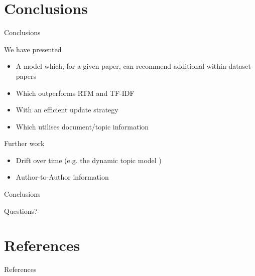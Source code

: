 \documentclass[xcolor=dvipsnames]{beamer}
\begin{document}

\section{Conclusions}
\begin{frame}{Conclusions}

We have presented
\begin{itemize}
    \item A model which, for a given paper, can recommend additional within-dataset papers 
    \item Which outperforms RTM and TF-IDF
    \item With an efficient update strategy
    \item Which utilises document/topic information 
\end{itemize}
Further work
\begin{itemize}
    \item Drift over time (e.g. the dynamic topic model \cite{Blei2006a})
    \item Author-to-Author information
\end{itemize}

\end{frame}

\begin{frame}{Conclusions}

Questions?

\end{frame}




\section{References}
\begin{frame}[allowframebreaks]{References}

{\tiny 
    
    
}

\end{frame}
\end{document}
